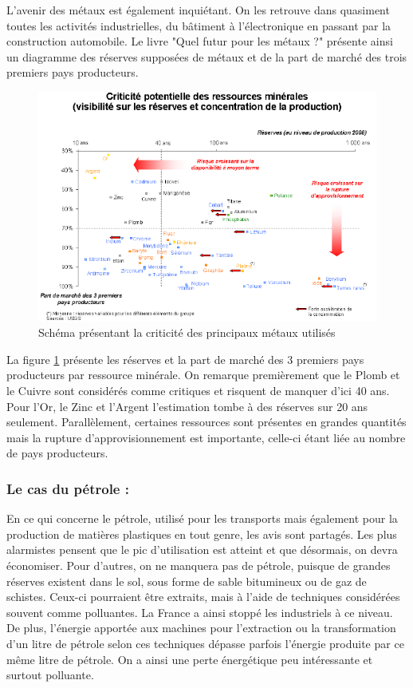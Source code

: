 L'avenir des métaux est également inquiétant. On les retrouve dans quasiment toutes les activités industrielles, du bâtiment à l’électronique en passant par la construction automobile. Le livre "Quel futur pour les métaux ?" \cite{LivreFuturMetaux} présente ainsi un diagramme des réserves supposées de métaux et de la part de marché des trois premiers pays producteurs.

\begin{figure}[!h]
\includegraphics[scale=0.75]{Rsc/risquemetaux.png}
\caption{Schéma présentant la criticité des principaux métaux utilisés}
\label{CriticiteMetaux}%
\end{figure}

\bigbreak La figure \ref{CriticiteMetaux} présente les réserves et la part de marché des 3 premiers pays producteurs par ressource minérale. On remarque premièrement que le Plomb et le Cuivre sont considérés comme critiques et risquent de manquer d'ici 40 ans. Pour l'Or, le Zinc et l'Argent l'estimation tombe à des réserves sur 20 ans seulement. Parallèlement, certaines ressources sont présentes en grandes quantités mais la rupture d'approvisionnement est importante, celle-ci étant liée au nombre de pays producteurs.


\subsubsection{Le cas du pétrole : }

En ce qui concerne le pétrole, utilisé pour les transports mais également pour la production de matières plastiques en tout genre, les avis sont partagés. Les plus alarmistes pensent que le pic d'utilisation est atteint et que désormais, on devra économiser. Pour d'autres, on ne manquera pas de pétrole, puisque de grandes réserves existent dans le sol, sous forme de sable bitumineux ou de gaz de schistes. Ceux-ci pourraient être extraits, mais à l'aide de techniques considérées souvent comme polluantes. La France a ainsi stoppé les industriels à ce niveau. De plus, l'énergie apportée aux machines pour l'extraction ou la transformation d'un litre de pétrole selon ces techniques dépasse parfois l’énergie produite par ce même litre de pétrole. On a ainsi une perte énergétique peu intéressante et surtout polluante.

